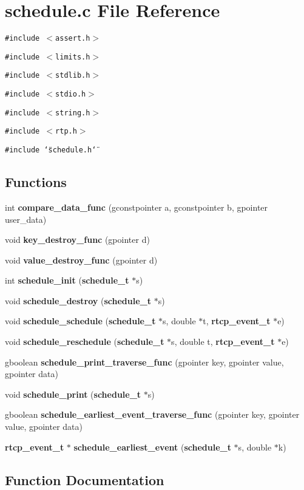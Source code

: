 \section{schedule.c File Reference}
\label{schedule_8c}
{\tt \#include $<$assert.h$>$}\par
{\tt \#include $<$limits.h$>$}\par
{\tt \#include $<$stdlib.h$>$}\par
{\tt \#include $<$stdio.h$>$}\par
{\tt \#include $<$string.h$>$}\par
{\tt \#include $<$rtp.h$>$}\par
{\tt \#include \char`\"{}schedule.h\char`\"{}}\par
\subsection*{Functions}
\begin{CompactItemize}
\item 
int {\bf compare\_\-data\_\-func} (gconstpointer a, gconstpointer b, gpointer user\_\-data)
\item 
void {\bf key\_\-destroy\_\-func} (gpointer d)
\item 
void {\bf value\_\-destroy\_\-func} (gpointer d)
\item 
int {\bf schedule\_\-init} ({\bf schedule\_\-t} $\ast$s)
\item 
void {\bf schedule\_\-destroy} ({\bf schedule\_\-t} $\ast$s)
\item 
void {\bf schedule\_\-schedule} ({\bf schedule\_\-t} $\ast$s, double $\ast$t, {\bf rtcp\_\-event\_\-t} $\ast$e)
\item 
void {\bf schedule\_\-reschedule} ({\bf schedule\_\-t} $\ast$s, double t, {\bf rtcp\_\-event\_\-t} $\ast$e)
\item 
gboolean {\bf schedule\_\-print\_\-traverse\_\-func} (gpointer key, gpointer value, gpointer data)
\item 
void {\bf schedule\_\-print} ({\bf schedule\_\-t} $\ast$s)
\item 
gboolean {\bf schedule\_\-earliest\_\-event\_\-traverse\_\-func} (gpointer key, gpointer value, gpointer data)
\item 
{\bf rtcp\_\-event\_\-t} $\ast$ {\bf schedule\_\-earliest\_\-event} ({\bf schedule\_\-t} $\ast$s, double $\ast$k)
\end{CompactItemize}


\subsection{Function Documentation}
